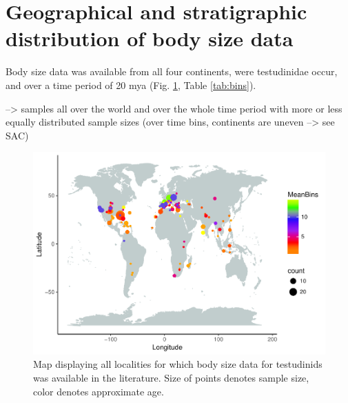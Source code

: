 \section{Geographical and stratigraphic distribution of body size data}

Body size data was available from all four continents, were testudinidae occur, and over a time period of 20 mya (Fig. \ref{fig:mapBS}, Table \ref{tab:bins}).

--> samples all over the world and over the whole time period with more or less equally distributed sample sizes (over time bins, continents are uneven --> see SAC)





\begin{figure}[htbp]
	\centering
	\includegraphics[width=\textwidth]{MA_JJ_files/figure-latex/MapCL-1.pdf}
	\caption[Map: body size localities]{Map displaying all localities for which body size data for testudinids was available in the literature. Size of points denotes sample size, color denotes approximate age.}
	\label{fig:mapBS}
\end{figure}
